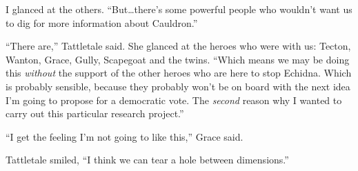 I glanced at the others.  ``But\ldots there's some powerful people who wouldn't want us to dig for more information about Cauldron.''



``There are,'' Tattletale said.  She glanced at the heroes who were with us: Tecton, Wanton, Grace, Gully, Scapegoat and the twins.  ``Which means we may be doing this \emph{without} the support of the other heroes who are here to stop Echidna.  Which is probably sensible, because they probably won't be on board with the next idea I'm going to propose for a democratic vote.  The \emph{second} reason why I wanted to carry out this particular research project.''



``I get the feeling I'm not going to like this,'' Grace said.



Tattletale smiled, ``I think we can tear a hole between dimensions.''






